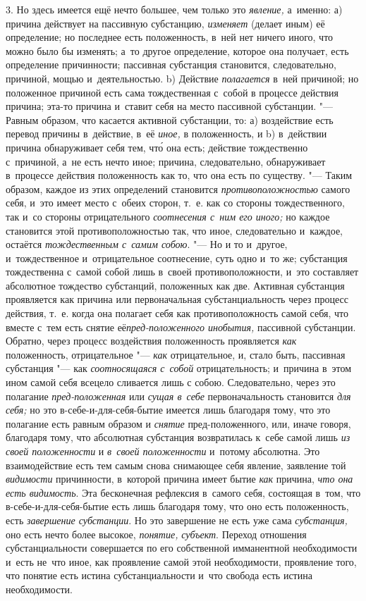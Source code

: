 3. Но здесь имеется ещё нечто большее, чем только это {\em явление,} а~именно:
а) причина действует на пассивную субстанцию, {\em изменяет} (делает
иным) её определение; но последнее есть положенность, в~ней нет ничего
иного, что можно было бы изменять; а~то другое определение, которое она
получает, есть определение причинности; пассивная субстанция становится,
следовательно, причиной, мощью и~деятельностью. b) Действие {\em полагается}
в~ней причиной; но положенное причиной есть сама тождественная с~собой в
процессе действия причина; эта-то причина и~ставит себя на место пассивной
субстанции. "--- Равным образом, что касается активной субстанции, то:
а) воздействие есть перевод причины в~действие, в~её {\em иное,} в
положенность, и b) в~действии причина обнаруживает себя тем, чт\'{о} она есть;
действие тождественно с~причиной, а~не есть нечто иное; причина,
следовательно, обнаруживает в~процессе действия положенность как то, что
она есть по существу. "--- Таким образом, каждое из этих
определений становится {\em противоположностью}
самого себя, и~это имеет место с~обеих сторон, т.~е. как со стороны
тождественного, так и~со стороны отрицательного {\em соотнесения с~ним его
иного;} но каждое становится этой противоположностью так, что иное,
следовательно и~каждое, остаётся {\em тождественным с~самим собою}. "--- Но и
то и~другое, и~тождественное и~отрицательное соотнесение, суть одно и~то же;
субстанция тождественна с~самой собой лишь в~своей противоположности, и~это
составляет абсолютное тождество субстанций, положенных как две. Активная
субстанция проявляется как причина или первоначальная субстанциальность
через процесс действия, т.~е. когда она полагает себя как противоположность
самой себя, что вместе с~тем есть снятие её{\em пред-положенного инобытия,}
пассивной субстанции. Обратно, через процесс воздействия положенность
проявляется {\em как} положенность, отрицательное "--- {\em как} отрицательное,
и, стало быть, пассивная субстанция "--- как {\em соотносящаяся с~собой}
отрицательность; и~причина в~этом ином самой себя всецело сливается лишь с
собою. Следовательно, через это полагание {\em пред-положенная} или
{\em сущая в~себе} первоначальность становится {\em для себя;} но это
в-себе-и-для-себя-бытие имеется лишь благодаря тому, что это полагание есть
равным образом и {\em снятие} пред-положенного, или, иначе говоря, благодаря
тому, что абсолютная субстанция возвратилась к~себе самой лишь {\em из своей
положенности} и {\em в~своей положенности} и~потому абсолютна. Это
взаимодействие есть тем самым снова снимающее себя явление, заявление той
{\em видимости} причинности, в~которой причина имеет бытие {\em как} причина,
{\em что она есть видимость}. Эта бесконечная рефлексия в~самого себя,
состоящая в~том, что в-себе-и-для-себя-бытие есть лишь благодаря тому, что
оно есть положенность, есть {\em завершение субстанции}. Но это завершение
не есть уже сама {\em субстанция,} оно есть нечто более высокое, {\em понятие,}
{\em субъект}. Переход отношения субстанциальности совершается по его
собственной имманентной необходимости и~есть не~что иное, как проявление
самой этой необходимости, проявление того, что понятие есть истина
субстанциальности и~что свобода есть истина необходимости.


